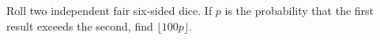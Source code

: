 Roll two independent fair six-sided dice. If $p$ is the probability that the first result exceeds the second, find $\lfloor100p\rfloor$.
